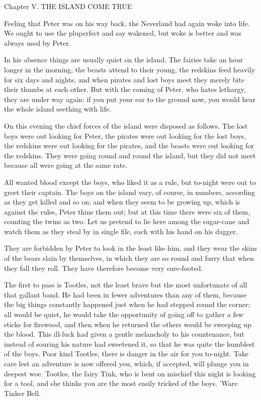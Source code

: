 Chapter V.
THE ISLAND COME TRUE


Feeling that Peter was on his way back, the Neverland had again woke
into life. We ought to use the pluperfect and say wakened, but woke is
better and was always used by Peter.

In his absence things are usually quiet on the island. The fairies take
an hour longer in the morning, the beasts attend to their young, the
redskins feed heavily for six days and nights, and when pirates and
lost boys meet they merely bite their thumbs at each other. But with
the coming of Peter, who hates lethargy, they are under way again: if
you put your ear to the ground now, you would hear the whole island
seething with life.

On this evening the chief forces of the island were disposed as
follows. The lost boys were out looking for Peter, the pirates were out
looking for the lost boys, the redskins were out looking for the
pirates, and the beasts were out looking for the redskins. They were
going round and round the island, but they did not meet because all
were going at the same rate.

All wanted blood except the boys, who liked it as a rule, but to-night
were out to greet their captain. The boys on the island vary, of
course, in numbers, according as they get killed and so on; and when
they seem to be growing up, which is against the rules, Peter thins
them out; but at this time there were six of them, counting the twins
as two. Let us pretend to lie here among the sugar-cane and watch them
as they steal by in single file, each with his hand on his dagger.

They are forbidden by Peter to look in the least like him, and they
wear the skins of the bears slain by themselves, in which they are so
round and furry that when they fall they roll. They have therefore
become very sure-footed.

The first to pass is Tootles, not the least brave but the most
unfortunate of all that gallant band. He had been in fewer adventures
than any of them, because the big things constantly happened just when
he had stepped round the corner; all would be quiet, he would take the
opportunity of going off to gather a few sticks for firewood, and then
when he returned the others would be sweeping up the blood. This
ill-luck had given a gentle melancholy to his countenance, but instead
of souring his nature had sweetened it, so that he was quite the
humblest of the boys. Poor kind Tootles, there is danger in the air for
you to-night. Take care lest an adventure is now offered you, which, if
accepted, will plunge you in deepest woe. Tootles, the fairy Tink, who
is bent on mischief this night is looking for a tool, and she thinks
you are the most easily tricked of the boys. 'Ware Tinker Bell.

